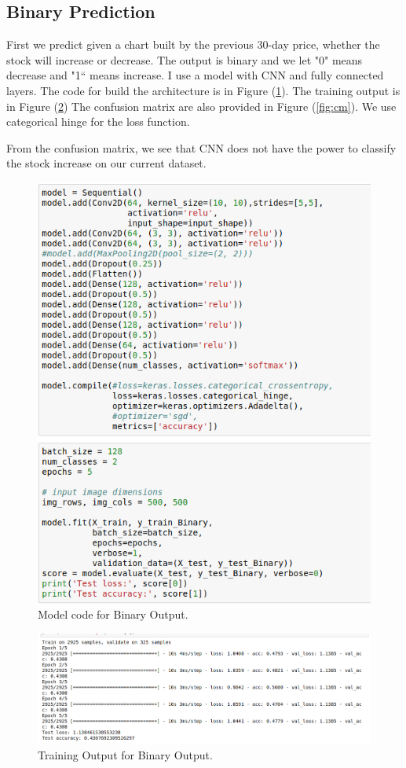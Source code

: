 \documentclass[12pt]{article}
\begin{document}
\subsection{Binary Prediction}
First we predict given a chart built by the previous 30-day price, whether the stock will increase or decrease. The output is binary and we let "0" means decrease and "1“ means increase.  I use a model with CNN and fully connected layers. The code for build the architecture is in Figure (\ref{fig:m1}). The training output is in Figure (\ref{fig:tr1}) The confusion matrix are also provided in Figure (\ref{fig:cm}). We use categorical hinge for the loss function.

From the confusion matrix, we see that CNN does not have the power to classify the stock increase on our current dataset.
\begin{figure}[h]
	\centering
	\includegraphics[scale=0.6]{model1}
	\caption{Model code for Binary Output.}
	\label{fig:m1}
\end{figure}

\begin{figure}[h]
	\centering
	\includegraphics[scale=0.5]{res1}
	\caption{Training Output for Binary Output.}
	\label{fig:tr1}
\end{figure}
\end{document}
